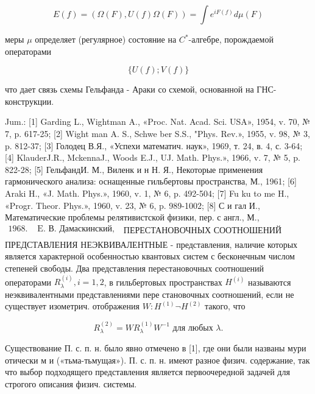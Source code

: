 \documentclass[10pt]{article}
\begin{document}
\[

E(f)=(\Omega(F), U(f) \Omega(F))=\int e^{i F(f)} d \mu(F)

\]



меры $\mu$ определяет (регулярное) состояние на $C^{*}$-алгебре, порождаемой операторами



\[

\{U(f) ; V(f)\}

\]



что дает связь схемы Гельфанда - Араки со схемой, основанной на ГНС-конструкции.



Jum.: [1] Garding L., Wightman A., «Proc. Nat. Acad. Sci. USA», 1954, v. 70, № 7, p. 617-25; [2] Wight man A. S., Schwe ber S.S., "Phys. Rev.», 1955, v. 98, № 3, p. 812-37; [3] Голодец В.Я., «Успехи математич. наук», 1969, т. 24, в. 4, с. 3-64; [4] KlauderJ.R., MckennaJ., Woods E.J., UJ. Math. Phys.», 1966, v. 7, № 5, p. 822-28; [5] ГельфандИ. М., Виленк и н Н. Я., Некоторые применения гармонического анализа: оснащенные гильбертовы пространства, М., 1961; [6] Araki H., «J. Math. Phys.», 1960, v. 1, № 6, p. 492-504; [7] Fu ku to me H., «Progr. Theor. Phys.», 1960, v. 23, № 6, p. 989-1002; [8] С и гал И., Математические проблемы релятивистской физики, пер. с англ., М., $\begin{array}{ll}1968 . & \text { E. В. Дамаскинский, } \\ & \end{array}$ ПЕРЕСТАНОВОЧНЫХ СООТНОШЕНИЙ ПРЕДСТАВЛЕНИЯ НЕЭКВИВАЛЕНТНЫЕ - представления, наличие которых является характерной особенностью квантовых систем с бесконечным числом степеней свободы. Два представления перестановочных соотношений операторами $R_{\lambda}^{(i)}, i=1,2$, в гильбертовых пространствах $H^{(i)}$ называются неэквивалентными представлениями пере становочных соотношений, если не существует изометрич. отображения $W: H^{(1)} \neg H^{(2)}$ такого, что



\[

R_{\lambda}^{(2)}=W R_{\lambda}^{(1)} W^{-1} \text { для любых } \lambda .

\]



Существование П. с. п. н. было явно отмечено в [1], где они были названы мури отически м и («тьма-тьмущая»). П. с. п. н. имеют разное физич. содержание, так что выбор подходящего представления является первоочередной задачей для строгого описания физич. системы.
\end{document}
